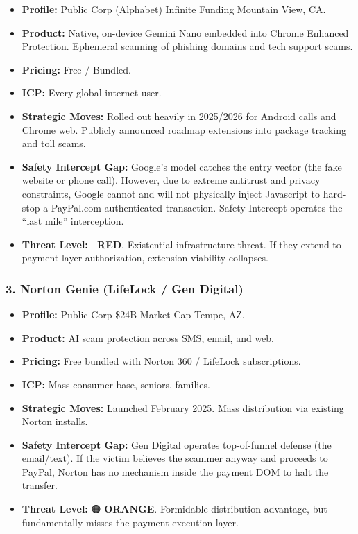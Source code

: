 \documentclass[
]{article}
\providecommand{\tightlist}{%
  \setlength{\itemsep}{0pt}\setlength{\parskip}{0pt}}
\begin{document}
\begin{itemize}
\tightlist
\item
  \textbf{Profile:} Public Corp (Alphabet) \textbar{} Infinite Funding
  \textbar{} Mountain View, CA.
\item
  \textbf{Product:} Native, on-device Gemini Nano embedded into Chrome
  Enhanced Protection. Ephemeral scanning of phishing domains and tech
  support scams.
\item
  \textbf{Pricing:} Free / Bundled.
\item
  \textbf{ICP:} Every global internet user.
\item
  \textbf{Strategic Moves:} Rolled out heavily in 2025/2026 for Android
  calls and Chrome web. Publicly announced roadmap extensions into
  package tracking and toll scams.
\item
  \textbf{Safety Intercept Gap:} Google's model catches the entry vector
  (the fake website or phone call). However, due to extreme antitrust
  and privacy constraints, Google cannot and will not physically inject
  Javascript to hard-stop a PayPal.com authenticated transaction. Safety
  Intercept operates the ``last mile'' interception.
\item
  \textbf{Threat Level:} 🔴 \textbf{RED}. Existential infrastructure
  threat. If they extend to payment-layer authorization, extension
  viability collapses.
\end{itemize}

\subsubsection{3. Norton Genie (LifeLock / Gen
Digital)}\label{norton-genie-lifelock-gen-digital}

\begin{itemize}
\tightlist
\item
  \textbf{Profile:} Public Corp \textbar{} \$24B Market Cap \textbar{}
  Tempe, AZ.
\item
  \textbf{Product:} AI scam protection across SMS, email, and web.
\item
  \textbf{Pricing:} Free bundled with Norton 360 / LifeLock
  subscriptions.
\item
  \textbf{ICP:} Mass consumer base, seniors, families.
\item
  \textbf{Strategic Moves:} Launched February 2025. Mass distribution
  via existing Norton installs.
\item
  \textbf{Safety Intercept Gap:} Gen Digital operates top-of-funnel
  defense (the email/text). If the victim believes the scammer anyway
  and proceeds to PayPal, Norton has no mechanism inside the payment DOM
  to halt the transfer.
\item
  \textbf{Threat Level:} 🟠 \textbf{ORANGE}. Formidable distribution
  advantage, but fundamentally misses the payment execution layer.
\end{itemize}
\end{document}
